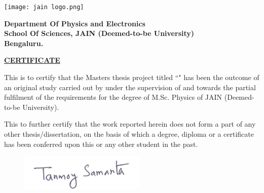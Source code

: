 

\thispagestyle{empty}

\begin{center}

    \texttt{[image: jain logo.png]}

    \large
    \vspace{0.5cm}

    \textbf{Department Of Physics and Electronics\\
        School Of Sciences, JAIN (Deemed-to-be University)\\
        Bengaluru.}

    \vspace{0.5cm}

    \underline{\textbf{CERTIFICATE}}

\end{center}

\normalfont{}
\noindent
This is to certify that the Masters thesis project titled ``\textbf{\projectname}" has been
the outcome of an original study carried out by \textbf{\auth} under the supervision of
\textbf{\gnameOne} and \textbf{\gnameTwo} towards the partial fulfilment of the requirements
for the degree of M.Sc. Physics of JAIN (Deemed-to-be University).

\vspace{0.5cm}

\setlength{\parskip}{0cm}
\noindent
    {
        This to further certify that the work reported herein does not form a part of any other thesis/dissertation, on the basis of which a degree, diploma or a certificate has been conferred upon this or any other student in the past.
    }


    \vspace{0.25cm}
    \noindent
    \renewcommand{\arraystretch}{0.8}
    \renewcommand\theadfont{\bfseries}

    \begin{figure}[h!]
        \centering
        \includegraphics[scale=0.75, right]{images/tanmoy_sign.png}
    \end{figure}

